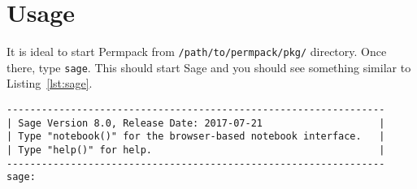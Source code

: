 \documentclass[12pt, a4paper, twoside]{report}
\begin{document}
\section{Usage}
\label{sec:permpack-usage}

It is ideal to start Permpack from \texttt{/path/to/permpack/pkg/} directory. Once there, type \texttt{sage}. This should start Sage and you should see something similar to Listing~\ref{lst:sage}.
 {}
\begin{lstlisting}
-----------------------------------------------------------------
| Sage Version 8.0, Release Date: 2017-07-21                    |
| Type "notebook()" for the browser-based notebook interface.   |
| Type "help()" for help.                                       |
-----------------------------------------------------------------
sage:
\end{lstlisting}
\end{document}
